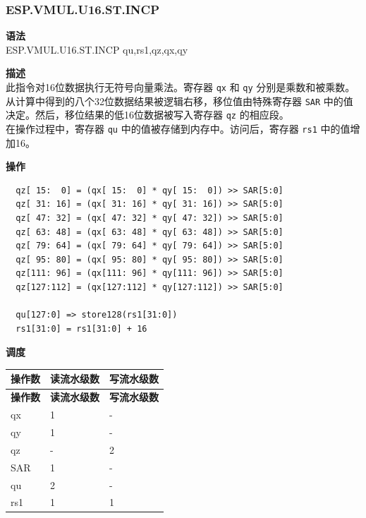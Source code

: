 \newpage
\subsubsection{ESP.VMUL.U16.ST.INCP}\label{instruction:ESPVMULU16STINCP}
\textbf{语法}\\
ESP.VMUL.U16.ST.INCP qu,rs1,qz,qx,qy

\textbf{描述}\\
此指令对16位数据执行无符号向量乘法。寄存器 \lstinline{qx} 和 \lstinline{qy} 分别是乘数和被乘数。从计算中得到的八个32位数据结果被逻辑右移，移位值由特殊寄存器 \lstinline{SAR} 中的值决定。然后，移位结果的低16位数据被写入寄存器 \lstinline{qz} 的相应段。\\ 在操作过程中，寄存器 \lstinline{qu} 中的值被存储到内存中。访问后，寄存器 \lstinline{rs1} 中的值增加16。

\textbf{操作}\\
\begin{lstlisting}
  qz[ 15:  0] = (qx[ 15:  0] * qy[ 15:  0]) >> SAR[5:0]
  qz[ 31: 16] = (qx[ 31: 16] * qy[ 31: 16]) >> SAR[5:0]
  qz[ 47: 32] = (qx[ 47: 32] * qy[ 47: 32]) >> SAR[5:0]
  qz[ 63: 48] = (qx[ 63: 48] * qy[ 63: 48]) >> SAR[5:0]
  qz[ 79: 64] = (qx[ 79: 64] * qy[ 79: 64]) >> SAR[5:0]
  qz[ 95: 80] = (qx[ 95: 80] * qy[ 95: 80]) >> SAR[5:0]
  qz[111: 96] = (qx[111: 96] * qy[111: 96]) >> SAR[5:0]
  qz[127:112] = (qx[127:112] * qy[127:112]) >> SAR[5:0]

  qu[127:0] => store128(rs1[31:0])
  rs1[31:0] = rs1[31:0] + 16
\end{lstlisting}


\textbf{调度}\\
\begin{longtable}[c]{|l|l|l|}
    \hline
    \rowcolor{lightgray}
    \textbf{操作数} & \textbf{读流水级数} & \textbf{写流水级数} \\\hline
    \endfirsthead
    \hline
    \rowcolor{lightgray}
     \textbf{操作数} & \textbf{读流水级数} & \textbf{写流水级数} \\\hline
    \endhead
    \hline
    \endfoot

    qx & 1 & - \\\hline
  qy & 1 & - \\\hline
     qz & - & 2 \\\hline
    SAR & 1 & - \\\hline
    qu & 2 & - \\\hline
    rs1 & 1 & 1

\end{longtable}

